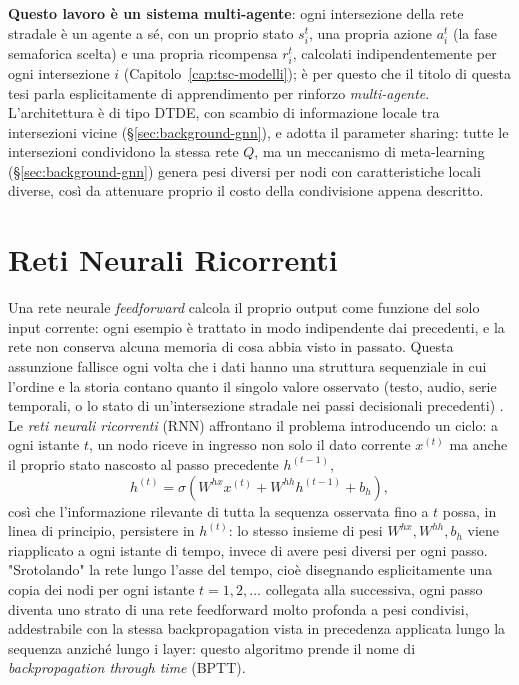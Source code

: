 \textbf{Questo lavoro è un sistema multi-agente}: ogni intersezione della
rete stradale è un agente a sé, con un proprio stato $s_i^t$, una propria
azione $a_i^t$ (la fase semaforica scelta) e una propria ricompensa
$r_i^t$, calcolati indipendentemente per ogni intersezione $i$
(Capitolo~\ref{cap:tsc-modelli}); è per questo che il titolo di questa
tesi parla esplicitamente di apprendimento per rinforzo
\emph{multi-agente}. L'architettura è di tipo DTDE, con scambio di
informazione locale tra intersezioni vicine (§\ref{sec:background-gnn}), e
adotta il parameter sharing: tutte le intersezioni condividono la stessa
rete $Q$, ma un meccanismo di meta-learning (§\ref{sec:background-gnn})
genera pesi diversi per nodi con caratteristiche locali diverse, così da
attenuare proprio il costo della condivisione appena descritto.

\section{Reti Neurali Ricorrenti}
\label{sec:background-rnn}

Una rete neurale \emph{feedforward} calcola il proprio output come
funzione del solo input corrente: ogni esempio è trattato in modo
indipendente dai precedenti, e la rete non conserva alcuna memoria di
cosa abbia visto in passato. Questa assunzione fallisce ogni volta che i
dati hanno una struttura sequenziale in cui l'ordine e la storia contano
quanto il singolo valore osservato (testo, audio, serie temporali, o lo
stato di un'intersezione stradale nei passi decisionali precedenti)
\citep{lipton2015rnnreview}. Le \emph{reti neurali ricorrenti} (RNN)
affrontano il problema introducendo un ciclo: a ogni istante $t$, un nodo
riceve in ingresso non solo il dato corrente $x^{(t)}$ ma anche il proprio
stato nascosto al passo precedente $h^{(t-1)}$,
\[h^{(t)} = \sigma\!\left(W^{hx} x^{(t)} + W^{hh} h^{(t-1)} + b_h\right),\]
così che l'informazione rilevante di tutta la sequenza osservata fino a
$t$ possa, in linea di principio, persistere in $h^{(t)}$: lo stesso
insieme di pesi $W^{hx}, W^{hh}, b_h$ viene riapplicato a ogni istante di
tempo, invece di avere pesi diversi per ogni passo. "Srotolando" la rete
lungo l'asse del tempo, cioè disegnando esplicitamente una copia dei nodi
per ogni istante $t=1,2,\dots$ collegata alla successiva, ogni passo
diventa uno strato di una rete feedforward molto profonda a pesi
condivisi, addestrabile con la stessa backpropagation vista in precedenza
applicata lungo la sequenza anziché lungo i layer: questo algoritmo
prende il nome di \emph{backpropagation through time} (BPTT).

